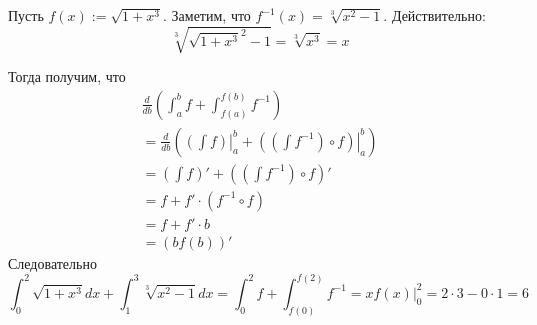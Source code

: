 \documentclass[12pt,a4paper]{article}
\begin{document}
    \begin{enumproblem}
        Пусть $f(x) := \sqrt{1 + x^3}$. Заметим, что $f^{-1}(x) = \sqrt[3]{x^2-1}$. Действительно:
        \[\sqrt[3]{\sqrt{1 + x^3}^2 - 1} = \sqrt[3]{x^3} = x\]

        Тогда получим, что
        \begin{multline*}
            \frac{d}{db}\left(\int_a^b f + \int_{f(a)}^{f(b)} f^{-1}\right)\\
            = \frac{d}{db}\left(\left.\left(\int f\right)\right|_a^b + \left.\left(\left(\int f^{-1}\right) \circ f\right)\right|_a^b\right)\\
            = \left(\int f\right)' + \left(\left(\int f^{-1}\right) \circ f\right)'\\
            = f + f' \cdot (f^{-1} \circ f)\\
            = f + f' \cdot b\\
            = (b f(b))'
        \end{multline*}
        Следовательно
        \[
            \int_0^2 \sqrt{1 + x^3} dx + \int_{1}^{3} \sqrt[3]{x^2 - 1} dx
            = \int_0^2 f + \int_{f(0)}^{f(2)} f^{-1}
            = \left.x f(x)\right|_0^2
            = 2 \cdot 3 - 0 \cdot 1
            = 6
        \]
    \end{enumproblem}
\end{document}
